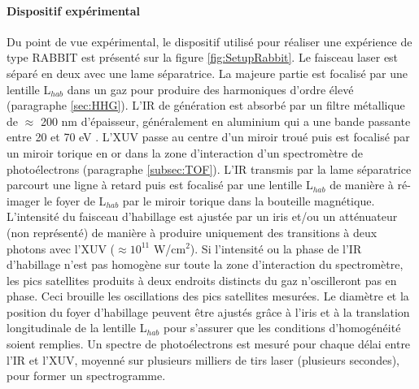 \paragraph{Dispositif expérimental} Du point de vue expérimental, le dispositif utilisé pour réaliser une expérience de type RABBIT est présenté sur la figure \ref{fig:SetupRabbit}. Le faisceau laser est séparé en deux avec une lame séparatrice. La majeure partie est focalisé par une lentille L$_{hab}$ dans un gaz pour produire des harmoniques d'ordre élevé (paragraphe \ref{sec:HHG}). L'IR de génération est absorbé par un filtre métallique de $\approx$ 200 nm d'épaisseur, généralement en aluminium qui a une bande passante entre 20 et 70 eV . L'XUV passe au centre d'un miroir troué puis est focalisé par un miroir torique en or dans la zone d'interaction d'un spectromètre de photoélectrons (paragraphe \ref{subsec:TOF}). L'IR transmis par la lame séparatrice parcourt une ligne à retard puis est focalisé par une lentille L$_{hab}$ de manière à ré-imager le foyer de L$_{hab}$ par le miroir torique dans la bouteille magnétique. L'intensité du faisceau d'habillage est ajustée par un iris et/ou un atténuateur (non représenté) de manière à produire uniquement des transitions à deux photons avec l'XUV ($\approx 10^{11}$ W/cm$^2$). Si l'intensité ou la phase de l'IR d'habillage n'est pas homogène sur toute la zone d'interaction du spectromètre, les pics satellites produits à deux endroits distincts du gaz n'oscilleront pas en phase. Ceci brouille les oscillations des pics satellites mesurées. Le diamètre et la position du foyer d'habillage peuvent être ajustés grâce à l'iris et à la translation longitudinale de la lentille L$_{hab}$ pour s'assurer que les conditions d'homogénéité soient remplies. Un spectre de photoélectrons est mesuré pour chaque délai entre l'IR et l'XUV, moyenné sur plusieurs milliers de tirs laser (plusieurs secondes), pour former un spectrogramme.

